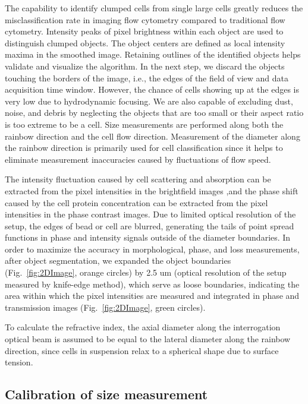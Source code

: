 \documentclass[aps,pra,reprint,superscriptaddress]{revtex4-1}
\begin{document}
The capability to identify clumped cells from single large cells greatly reduces the misclassification rate in imaging flow cytometry compared to traditional flow cytometry. Intensity peaks of pixel brightness within each object are used to distinguish clumped objects. The object centers are defined as local intensity maxima in the smoothed image. Retaining outlines of the identified objects helps validate and visualize the algorithm. In the next step, we discard the objects touching the borders of the image, i.e., the edges of the field of view and data acquisition time window. However, the chance of cells showing up at the edges is very low due to hydrodynamic focusing. We are also capable of excluding dust, noise, and debris by neglecting the objects that are too small or their aspect ratio is too extreme to be a cell. Size measurements are performed along both the rainbow direction and the cell flow direction. Measurement of the diameter along the rainbow direction is primarily used for cell classification since it helps to eliminate measurement inaccuracies caused by fluctuations of flow speed. 

The intensity fluctuation caused by cell scattering and absorption can be extracted from the pixel intensities in the brightfield images ,and the phase shift caused by the cell protein concentration can be extracted from the pixel intensities in the phase contrast images. Due to limited optical resolution of the setup, the edges of bead or cell are blurred, generating the tails of point spread functions in phase and intensity signals outside of the diameter boundaries. In order to maximize the accuracy in morphological, phase, and loss measurements, after object segmentation, we expanded the object boundaries (Fig.~\ref{fig:2DImage}, orange circles) by 2.5 um (optical resolution of the setup measured by knife-edge method), which serve as loose boundaries, indicating the area within which the pixel intensities are measured and integrated in phase and transmission images (Fig.~\ref{fig:2DImage}, green circles).

To calculate the refractive index, the axial diameter along the interrogation optical beam is assumed to be equal to the lateral diameter along the rainbow direction, since cells in suspension relax to a spherical shape due to surface tension.

\subsection{Calibration of size measurement}
\end{document}
